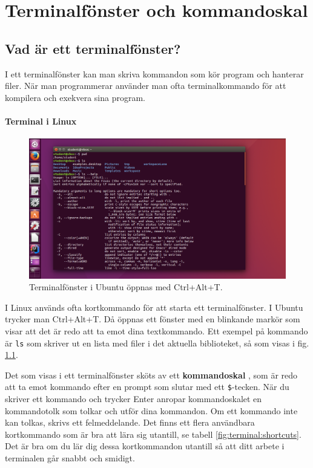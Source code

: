 
\chapter{Terminalfönster och kommandoskal}\label{appendix:terminal}

\section{Vad är ett terminalfönster?}

I ett terminalfönster kan man skriva kommandon som kör program och hanterar filer. När man programmerar använder man ofta terminalkommando för att kompilera och exekvera sina program.  
 
\subsubsection{Terminal i Linux}

    \begin{figure}[!b]
    \centering
    \includegraphics[width=1.0\textwidth]{../img/linux-terminal.png}
    \caption{Terminalfönster i Ubuntu öppnas med Ctrl+Alt+T.}
    \label{fig:terminal:linux}
    \end{figure}

I Linux används ofta kortkommando för att starta ett terminalfönster. I Ubuntu trycker man Ctrl+Alt+T.  Då öppnas ett fönster med en blinkande markör som visar att det är redo att ta emot dina textkommando. Ett exempel på kommando är \texttt{ls} som skriver ut en lista med filer i det aktuella biblioteket, så som visas i fig. \ref{fig:terminal:linux}.

Det som visas i ett terminalfönster sköts av ett \textbf{kommandoskal} , som är redo att ta emot kommando efter en prompt som slutar med ett \texttt{\$}-tecken. När du skriver ett kommando och trycker Enter anropar kommandoskalet en kommandotolk som tolkar och utför dina kommandon. Om ett kommando inte kan tolkas, skrivs ett felmeddelande. Det finns ett flera användbara kortkommando som är bra att lära sig utantill, se tabell \ref{fig:terminal:shortcuts}. Det är bra om du lär dig dessa kortkommandon utantill så att ditt arbete i terminalen går snabbt och smidigt.

